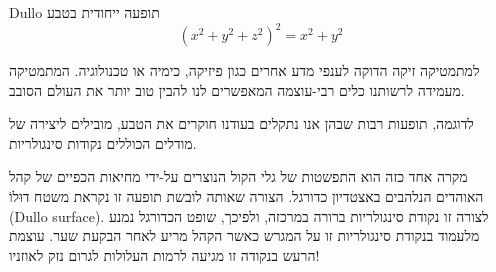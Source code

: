 \begin{surferPage}{\textenglish{Dullo}}
תופעה ייחודית בטבע
\smallskip
\[(x^2+ y^2+ z^2)^2	= x^2+ y^2\]

למתמטיקה זיקה הדוקה לענפי מדע אחרים כגון פיזיקה, כימיה או טכנולוגיה. המתמטיקה מעמידה לרשותנו כלים רבי-עוצמה המאפשרים לנו להבין טוב יותר את העולם הסובב. 

לדוגמה, תופעות רבות שבהן אנו נתקלים בעודנו חוקרים את הטבע, מובילים ליצירה של מודלים הכוללים נקודות סינגולריות.

מקרה אחד כזה הוא התפשטות של גלי הקול הנוצרים על-ידי מחיאות הכפיים של קהל האוהדים הנלהבים באצטדיון כדורגל. הצורה שאותה לובשת תופעה זו נקראת משטח דוּלוֹ 
\textenglish{(Dullo surface)}. לצורה זו נקודת סינגולריות ברורה במרכזה, ולפיכך, שופט הכדורגל נמנע מלעמוד בנקודת סינגולריות זו על המגרש כאשר הקהל מריע לאחר הבקעת שער. עוצמת הרעש בנקודה זו מגיעה לרמות העלולות לגרום נזק לאוזניו!
\end{surferPage}
